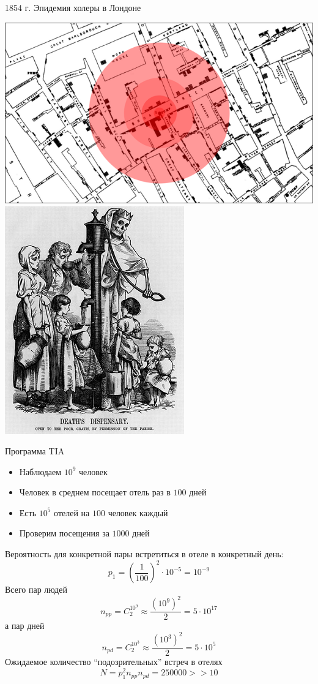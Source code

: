 \documentclass[10pt,a4paper]{beamer}
\begin{document}
\begin{frame}{1854 г. Эпидемия холеры в Лондоне}

\begin{center}
\includegraphics[scale=0.3]{images/success.png}\;
\includegraphics[scale=0.405]{images/cholera.jpg}
\end{center}

\end{frame}


\begin{frame}{Программа TIA}

\begin{itemize}
\item Наблюдаем $10^9$ человек
\item Человек в среднем посещает отель раз в $100$ дней
\item Есть $10^5$ отелей на $100$ человек каждый
\item Проверим посещения за $1000$ дней 
\end{itemize}

Вероятность для конкретной пары встретиться в отеле в конкретный день:
\[
p_1 = \left(\frac{1}{100}\right)^2 \cdot 10^{-5} = 10^{-9}
\]
Всего пар людей
\[
n_{pp} = C^{10^9}_2 \approx \frac{(10^9)^2}{2} = 5 \cdot 10^{17}
\]
а пар дней
\[
n_{pd} = C^{10^3}_2 \approx \frac{(10^3)^2}{2} = 5 \cdot 10^{5}
\]
Ожидаемое количество ``подозрительных'' встреч в отелях
\[
N = p_1^2 n_{pp} n_{pd} = 250000 >> 10
\]

\end{frame}
\end{document}
